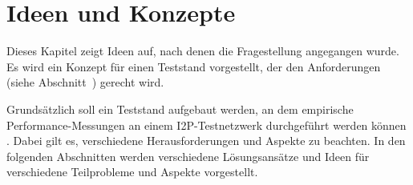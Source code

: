 \chapter{Ideen und Konzepte}
\label{ch:ideen_und_konzepte}

Dieses Kapitel zeigt Ideen auf, nach denen die Fragestellung angegangen wurde.
Es wird ein Konzept für einen Teststand vorgestellt, der den Anforderungen (siehe Abschnitt~) gerecht wird.






Grundsätzlich soll ein Teststand aufgebaut werden, an dem empirische Performance-Messungen an einem I2P-Testnetzwerk durchgeführt werden können .
Dabei gilt es, verschiedene Herausforderungen und Aspekte zu beachten.
In den folgenden Abschnitten werden verschiedene Lösungsansätze und Ideen für verschiedene Teilprobleme und Aspekte vorgestellt.



